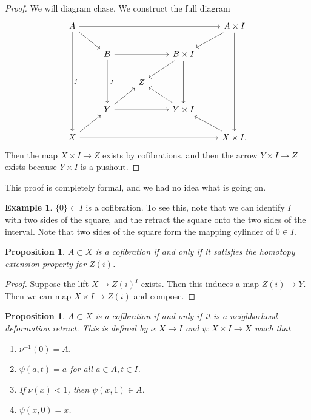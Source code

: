 \documentclass[leqno, openany]{memoir}
\newtheorem{prop}[thm]{Proposition}
\theoremstyle{definition}
\newtheorem{exm}[thm]{Example}
\theoremstyle{remark}
\theoremstyle{plain}
\theoremstyle{definition}
\theoremstyle{remark}
\begin{document}
\begin{proof}
    We will diagram chase. We construct the full diagram
    \begin{equation}
    \begin{tikzcd}
        A \arrow{rrrr} \arrow{dddd}{j} \arrow{dr} & & & & A \times I \arrow{dl} \arrow{dddd} \\
        & B \arrow{rr} \arrow{dd}{J} & & B \times I \arrow{dl} \arrow{dd} \\
        & & Z \\
        & Y \arrow{rr} \arrow{ur} & & Y \times I \arrow[dashrightarrow]{ul} \\
        X \arrow{ur} \arrow{rrrr} & & & & X \times I. \arrow{ul}
    \end{tikzcd}
    \end{equation}
    Then the map $X \times I \to Z$ exists by cofibrations, and then the arrow $Y \times I \to Z$ exists because $Y \times I$ is a pushout.
\end{proof}

This proof is completely formal, and we had no idea what is going on.

\begin{exm}
    $ \{ 0 \} \subset I$ is a cofibration. To see this, note that we can identify $I$ with two sides of the square, and the retract the square onto the two sides of the interval. Note that two sides of the square form the mapping cylinder of $0 \in I$.
\end{exm}

\begin{prop}
    $A \subset X$ is a cofibration if and only if it satisfies the homotopy extension property for $Z(i)$.
\end{prop}

\begin{proof}
    Suppose the lift $X \to Z(i)^I$ exists. Then this induces a map $Z(i) \to Y$. Then we can map $X \times I \to Z(i)$ and compose.
\end{proof}

\begin{prop}
    $A \subset X$ is a cofibration if and only if it is a neighborhood deformation retract. This is defined by $\nu \colon X \to I$ and $\psi \colon X \times I \to X$ wuch that
    \begin{enumerate}
        \item $\nu^{-1}(0) = A$.
        \item $\psi(a,t) = a$ for all $a \in A, t \in I$.
        \item If $\nu(x) < 1$, then $\psi(x,1) \in A$.
        \item $\psi(x,0) = x$.
    \end{enumerate}
\end{prop}
\end{document}
